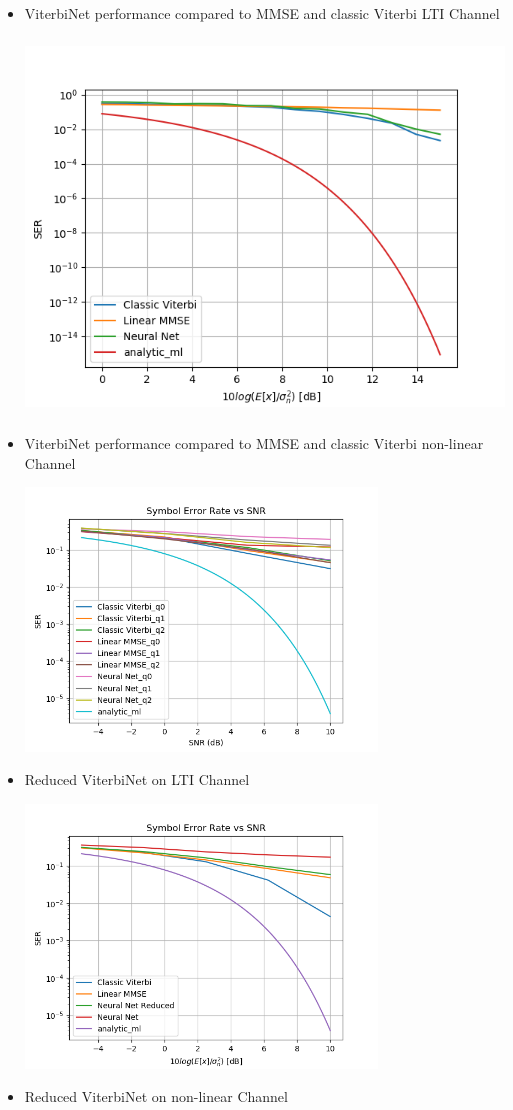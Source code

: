 \documentclass[12pt,a4paper]{report}
\begin{document}
\begin{itemize}
\item ViterbiNet performance compared to MMSE and classic Viterbi LTI Channel

	\includegraphics[width=\textwidth,height = 10cm]{results/lti_normal}

\item ViterbiNet performance compared to MMSE and classic Viterbi non-linear Channel

	\includegraphics[width=\textwidth,height = 7cm]{results/quant_standard}

\item Reduced ViterbiNet on LTI Channel

	\includegraphics[width=\textwidth,height = 7cm]{results/lti_reduced}

\item Reduced ViterbiNet on non-linear Channel

\end{itemize}
\end{document}
